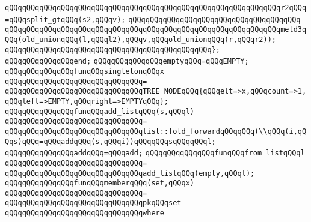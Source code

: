 \verb|qQQqqQQqqQQqqQQqqQQqqQQqqQQqqQQqqQQqqQQqqQQqqQQqqQQqqQQqqQQqqQQqr2qQQq=qQQqsplit_gtqQQq(s2,qQQqv);|\newline
\verb|qQQqqQQqqQQqqQQqqQQqqQQqqQQqqQQqqQQqqQQq|\newline
\verb|qQQqqQQqqQQqqQQqqQQqqQQqqQQqqQQqqQQqqQQqqQQqqQQqqQQqqQQqqQQqqQQqmeld3qQQq(old_unionqQQq(l,qQQql2),qQQqv,qQQqold_unionqQQq(r,qQQqr2));|\newline
\verb|qQQqqQQqqQQqqQQqqQQqqQQqqQQqqQQqqQQqqQQqqQQqqQQq};|\newline
\verb|qQQqqQQqqQQqqQQqend;|\newline
\newline
\verb|qQQqqQQqqQQqqQQqemptyqQQq=qQQqEMPTY;|\newline
\newline
\newline
\verb|qQQqqQQqqQQqqQQqfunqQQqsingletonqQQqx|\newline
\verb|qQQqqQQqqQQqqQQqqQQqqQQqqQQqqQQq=|\newline
\verb|qQQqqQQqqQQqqQQqqQQqqQQqqQQqqQQqTREE_NODEqQQq{qQQqelt=>x,qQQqcount=>1,qQQqleft=>EMPTY,qQQqright=>EMPTYqQQq};|\newline
\newline
\newline
\verb|qQQqqQQqqQQqqQQqfunqQQqadd_listqQQq(s,qQQql)|\newline
\verb|qQQqqQQqqQQqqQQqqQQqqQQqqQQqqQQq=|\newline
\verb|qQQqqQQqqQQqqQQqqQQqqQQqqQQqqQQqlist::fold_forwardqQQqqQQq(\\qQQq(i,qQQqs)qQQq=qQQqaddqQQq(s,qQQqi))qQQqqQQqsqQQqqQQql;|\newline
\newline
\verb|qQQqqQQqqQQqqQQqaddqQQq=qQQqadd;|\newline
\newline
\verb|qQQqqQQqqQQqqQQqfunqQQqfrom_listqQQql|\newline
\verb|qQQqqQQqqQQqqQQqqQQqqQQqqQQqqQQq=|\newline
\verb|qQQqqQQqqQQqqQQqqQQqqQQqqQQqqQQqadd_listqQQq(empty,qQQql);|\newline
\newline
\verb|qQQqqQQqqQQqqQQqfunqQQqmemberqQQq(set,qQQqx)|\newline
\verb|qQQqqQQqqQQqqQQqqQQqqQQqqQQqqQQq=|\newline
\verb|qQQqqQQqqQQqqQQqqQQqqQQqqQQqqQQqpkqQQqset|\newline
\verb|qQQqqQQqqQQqqQQqqQQqqQQqqQQqqQQqwhere|\newline
